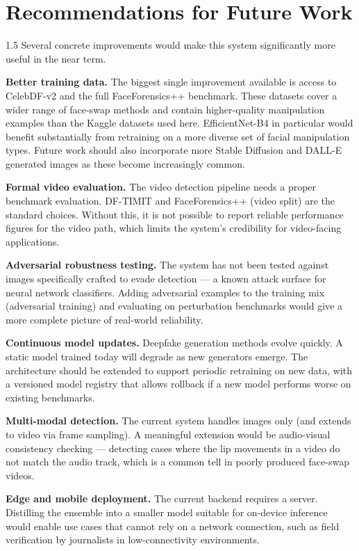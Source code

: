 \section{Recommendations for Future Work}

\begin{spacing}{1.5}
Several concrete improvements would make this system significantly more useful in the near term.

\noindent\textbf{Better training data.}\quad
The biggest single improvement available is access to CelebDF-v2 and the full FaceForensics++ benchmark. These datasets cover a wider range of face-swap methods and contain higher-quality manipulation examples than the Kaggle datasets used here. EfficientNet-B4 in particular would benefit substantially from retraining on a more diverse set of facial manipulation types. Future work should also incorporate more Stable Diffusion and DALL-E generated images as these become increasingly common.

\noindent\textbf{Formal video evaluation.}\quad
The video detection pipeline needs a proper benchmark evaluation. DF-TIMIT and FaceForensics++ (video split) are the standard choices. Without this, it is not possible to report reliable performance figures for the video path, which limits the system's credibility for video-facing applications.

\noindent\textbf{Adversarial robustness testing.}\quad
The system has not been tested against images specifically crafted to evade detection --- a known attack surface for neural network classifiers. Adding adversarial examples to the training mix (adversarial training) and evaluating on perturbation benchmarks would give a more complete picture of real-world reliability.

\noindent\textbf{Continuous model updates.}\quad
Deepfake generation methods evolve quickly. A static model trained today will degrade as new generators emerge. The architecture should be extended to support periodic retraining on new data, with a versioned model registry that allows rollback if a new model performs worse on existing benchmarks.

\noindent\textbf{Multi-modal detection.}\quad
The current system handles images only (and extends to video via frame sampling). A meaningful extension would be audio-visual consistency checking --- detecting cases where the lip movements in a video do not match the audio track, which is a common tell in poorly produced face-swap videos.

\noindent\textbf{Edge and mobile deployment.}\quad
The current backend requires a server. Distilling the ensemble into a smaller model suitable for on-device inference would enable use cases that cannot rely on a network connection, such as field verification by journalists in low-connectivity environments.
\end{spacing}

